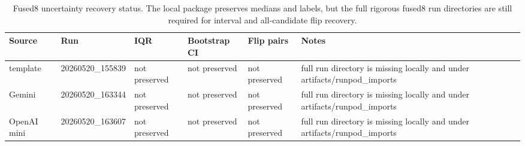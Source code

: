\begin{table}[htbp]
\centering
\caption{Fused8 uncertainty recovery status. The local package preserves medians and labels, but the full rigorous fused8 run directories are still required for interval and all-candidate flip recovery.}
\label{tab:fused8-uncertainty-recovery}
\scriptsize
\begin{tabularx}{\linewidth}{l l l l l X}
\toprule
Source & Run & IQR & Bootstrap CI & Flip pairs & Notes \\
\midrule
template & 20260520\_155839 & not preserved & not preserved & not preserved & full run directory is missing locally and under artifacts/runpod\_imports \\
Gemini & 20260520\_163344 & not preserved & not preserved & not preserved & full run directory is missing locally and under artifacts/runpod\_imports \\
OpenAI mini & 20260520\_163607 & not preserved & not preserved & not preserved & full run directory is missing locally and under artifacts/runpod\_imports \\
\bottomrule
\end{tabularx}
\end{table}
